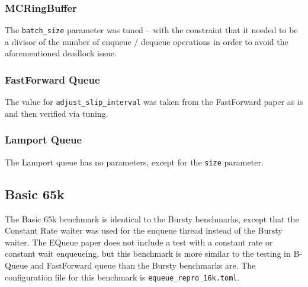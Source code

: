 \subsubsection*{MCRingBuffer}
The \texttt{batch\_size} parameter was tuned -- with the constraint that it needed to be a divisor of the
number of enqueue / dequeue operations in order to avoid the aforementioned deadlock issue.

\subsubsection*{FastForward Queue}
The value for \texttt{adjust\_slip\_interval} was taken from the FastForward paper as is and then verified via tuning.

\subsubsection*{Lamport Queue}
The Lamport queue has no parameters, except for the \texttt{size} parameter.

\subsection{Basic 65k}
The Basic 65k benchmark is identical to the Bursty benchmarks, except that the Constant Rate waiter was used
for the enqueue thread instead of the Bursty waiter.
The EQueue paper does not include a test with a constant rate or constant wait enqueueing, but this
benchmark is more similar to the testing in B-Queue and FastForward queue than the Bursty benchmarks are.
The configuration file for this benchmark is \texttt{equeue\_repro\_16k.toml}.
